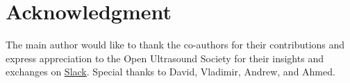 \documentclass{article}
\begin{document}
\section*{Acknowledgment}

The main author would like to thank the co-authors for their contributions and express appreciation to the Open Ultrasound Society for their insights and exchanges on \href{https://join.slack.com/t/usdevkit/shared_invite/zt-2g501obl-z53YHyGOOMZjeCXuXzjZow}{Slack}. Special thanks to David, Vladimir, Andrew, and Ahmed.

\clearpage



  
\end{document}

